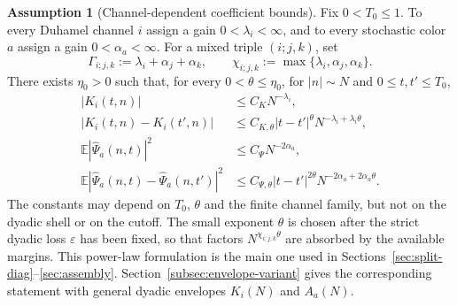 \documentclass[11pt,reqno]{amsart}
\numberwithin{equation}{section}
\theoremstyle{plain}
\theoremstyle{definition}
\newtheorem{assumption}[theorem]{Assumption}
\newcommand{\E}{\mathbb E}
\newcommand{\eps}{\varepsilon}
\newcommand{\wh}{\widehat}
\begin{document}
\begin{assumption}[Channel-dependent coefficient bounds]\label{ass:coeff}
Fix \(0<T_0\le1\).  To every Duhamel channel \(i\) assign a gain \(0<\lambda_i<\infty\), and to every stochastic color \(a\) assign a gain \(0<\alpha_a<\infty\).  For a mixed triple \((i;j,k)\), set
\begin{equation}\label{eq:Gamma-def}
        \Gamma_{i;j,k}:=\lambda_i+\alpha_j+\alpha_k,
        \qquad
        \chi_{i;j,k}:=\max\{\lambda_i,\alpha_j,\alpha_k\}.
\end{equation}
There exists \(\eta_0>0\) such that, for every \(0<\theta\le\eta_0\), for \(|n|\sim N\) and \(0\le t,t'\le T_0\),
\begin{align}
        |K_i(t,n)|&\le C_K N^{-\lambda_i},\label{eq:K-size}\\
        |K_i(t,n)-K_i(t',n)|&\le C_{K,\theta}|t-t'|^\theta N^{-\lambda_i+\lambda_i\theta},\label{eq:K-inc}\\
        \E|\wh\Psi_a(n,t)|^2&\le C_\Psi N^{-2\alpha_a},\label{eq:Psi-size}\\
        \E|\wh\Psi_a(n,t)-\wh\Psi_a(n,t')|^2&\le C_{\Psi,\theta}|t-t'|^{2\theta}N^{-2\alpha_a+2\alpha_a\theta}.
        \label{eq:Psi-inc}
\end{align}
The constants may depend on \(T_0\), \(\theta\) and the finite channel family, but not on the dyadic shell or on the cutoff.  The small exponent \(\theta\) is chosen after the strict dyadic loss \(\eps\) has been fixed, so that factors \(N^{\chi_{i;j,k}\theta}\) are absorbed by the available margins.  This power-law formulation is the main one used in Sections~\ref{sec:split-diag}--\ref{sec:assembly}.  Section~\ref{subsec:envelope-variant} gives the corresponding statement with general dyadic envelopes \(K_i(N)\) and \(A_a(N)\).
\end{assumption}
\end{document}
